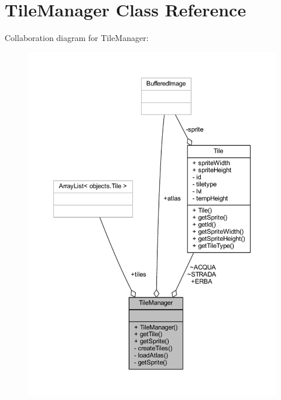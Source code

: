 \hypertarget{classmanagers_1_1_tile_manager}{}\section{Tile\+Manager Class Reference}
\label{classmanagers_1_1_tile_manager}


Collaboration diagram for Tile\+Manager\+:\nopagebreak
\begin{figure}[H]
\begin{center}
\leavevmode
\includegraphics[width=350pt]{classmanagers_1_1_tile_manager__coll__graph}
\end{center}
\end{figure}
